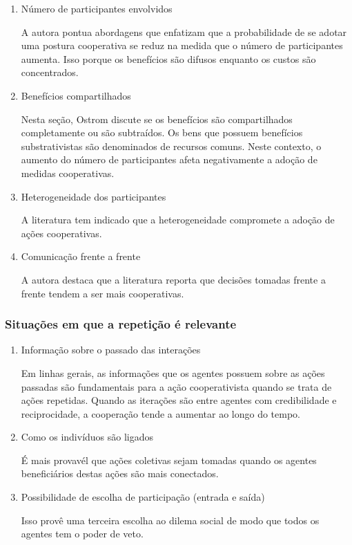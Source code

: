 \documentclass[11pt]{article}
\begin{document}
\begin{enumerate}
\item Número de participantes envolvidos
\label{sec:orge7ffc64}

A autora pontua abordagens que enfatizam que a probabilidade de se adotar uma postura cooperativa se reduz na medida que o número de participantes aumenta.
Isso porque os benefícios são difusos enquanto os custos são concentrados.

\item Benefícios compartilhados
\label{sec:orgaa2d63d}

Nesta seção, Ostrom discute se os benefícios são compartilhados completamente ou são subtraídos. 
Os bens que possuem benefícios substrativistas são denominados de recursos comuns.
Neste contexto, o aumento do número de participantes afeta negativamente a adoção de medidas cooperativas.

\item Heterogeneidade dos participantes
\label{sec:org8e4c9bc}

A literatura tem indicado que a heterogeneidade compromete a adoção de ações cooperativas.

\item Comunicação frente a frente
\label{sec:orgb513217}

A autora destaca que a literatura reporta que decisões tomadas frente a frente tendem a ser mais cooperativas.
\end{enumerate}

\subsubsection{Situações em que a repetição é relevante}
\label{sec:orgbe115be}

\begin{enumerate}
\item Informação sobre o passado das interações
\label{sec:org75803b2}

Em linhas gerais, as informações que os agentes possuem sobre as ações passadas são fundamentais para a ação cooperativista quando se trata de ações repetidas.
Quando as iterações são entre agentes com credibilidade e reciprocidade, a cooperação tende a aumentar ao longo do tempo.

\item Como os indivíduos são ligados
\label{sec:org0d06ec2}

É mais provavél que ações coletivas sejam tomadas quando os agentes beneficiários destas ações são mais conectados.

\item Possibilidade de escolha de participação (entrada e saída)
\label{sec:org957273f}

Isso provê uma terceira escolha ao dilema social de modo que todos os agentes tem o poder de veto.
\end{enumerate}
\end{document}

